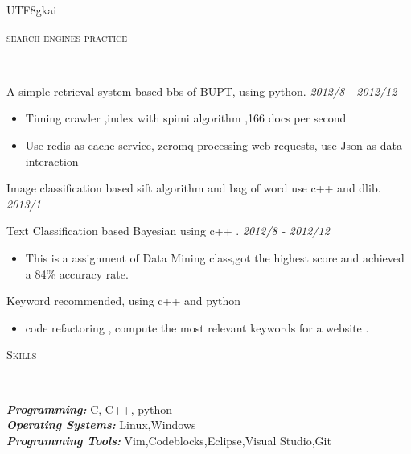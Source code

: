 \documentclass[9pt]{article}
\newenvironment{changemargin}[2]{%
  \begin{list}{}{%
    \setlength{\topsep}{0pt}%
    \setlength{\leftmargin}{#1}%
    \setlength{\rightmargin}{#2}%
    \setlength{\listparindent}{\parindent}%
    \setlength{\itemindent}{\parindent}%
    \setlength{\parsep}{\parskip}%
  }%
  \item[]}{\end{list}
}
\newcommand{\lineover}{
	\begin{changemargin}{-0.05in}{-0.05in}
		\vspace*{-8pt}
		\hrulefill \\
		\vspace*{-2pt}
	\end{changemargin}
}
\newcommand{\header}[1]{
	\begin{changemargin}{-0.5in}{-0.5in}
		\scshape{#1}\\
  	\lineover
	\end{changemargin}
}
\newenvironment{body} {
	\vspace*{-16pt}
	\begin{changemargin}{-0.25in}{-0.5in}
  }	
	{\end{changemargin}
}
\begin{document}
\begin{CJK}{UTF8}{gkai}
\begin{body}
\end{body}

\smallskip

\header{ search engines practice} 
\begin{body}
	\vspace{14pt}
	{A simple retrieval system based bbs of BUPT, using python.} \hfill \emph{ 2012/8 - 2012/12}\\
	\vspace*{-4pt}
	\begin{itemize} \itemsep -0pt
		\item  Timing crawler ,index with spimi algorithm ,166 docs  per second
		\item  Use redis as  cache service, zeromq processing web requests, use Json as  data interaction
	\end{itemize} 	
 	
    {Image classification  based sift algorithm and bag of word  use c++ and dlib.} \hfill \emph{ 2013/1}\\	
	\smallskip
	
    {Text Classification based Bayesian using c++ .} \hfill \emph{ 2012/8 - 2012/12}\\
	\vspace*{-4pt}
	\begin{itemize} \itemsep -0pt
		\item This is a assignment of Data Mining class,got the highest score and  achieved a 84\% accuracy rate.
	\end{itemize}

	
	{ Keyword recommended, using c++ and python  } \\
	\begin{itemize}
		\item code refactoring , compute the most relevant keywords for a website .
	\end{itemize}


\end{body}

\header{Skills}

\begin{body}
	\vspace{14pt}
	\emph{\textbf{Programming:}}{} C, C++, python \\
	\medskip
	\emph{\textbf{Operating Systems:}}{} Linux,Windows \\
	\medskip
	\emph{\textbf{Programming Tools:}}{} Vim,Codeblocks,Eclipse,Visual Studio,Git \\
\end{body}


\end{CJK}
\end{document}
